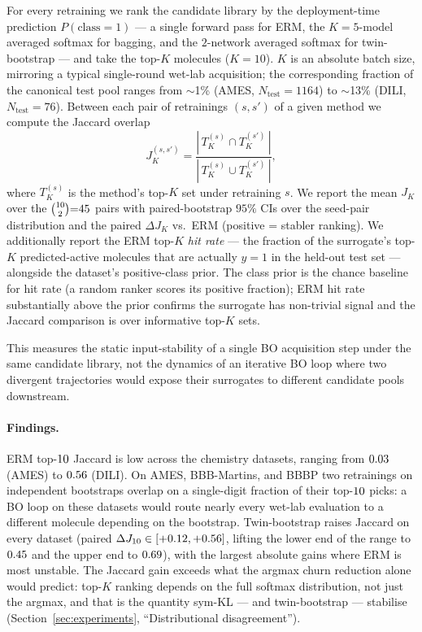 For every retraining we rank the candidate library by the
deployment-time prediction $P(\text{class}{=}1)$ --- a single
forward pass for ERM, the $K{=}5$-model averaged softmax for
bagging, and the $2$-network averaged softmax for twin-bootstrap
--- and take the top-$K$ molecules ($K{=}10$).  $K$ is an absolute
batch size, mirroring a typical single-round wet-lab acquisition;
the corresponding fraction of the canonical test pool ranges from
$\sim$1\% (AMES, $N_\text{test}{=}1164$) to $\sim$13\% (DILI,
$N_\text{test}{=}76$).  Between each pair of retrainings $(s, s')$
of a given method we compute the Jaccard overlap
\[
  J_K^{(s, s')} = \frac{|\,T_K^{(s)} \cap T_K^{(s')}\,|}
                       {|\,T_K^{(s)} \cup T_K^{(s')}\,|},
\]
where $T_K^{(s)}$ is the method's top-$K$ set under retraining $s$.
We report the mean $J_K$ over the $\binom{10}{2}{=}45$
pairs with paired-bootstrap $95\%$ CIs over the seed-pair
distribution and the paired $\Delta J_K$ vs.\ ERM (positive =
stabler ranking).  We additionally report the ERM top-$K$ \emph{hit
rate} --- the fraction of the surrogate's top-$K$ predicted-active
molecules that are actually $y{=}1$ in the held-out test set ---
alongside the dataset's positive-class prior.  The class prior is
the chance baseline for hit rate (a random ranker scores its
positive fraction); ERM hit rate substantially above the prior
confirms the surrogate has non-trivial signal and the Jaccard
comparison is over informative top-$K$ sets.

This measures the static input-stability of a single BO acquisition
step under the same candidate library, not the dynamics of an
iterative BO loop where two divergent trajectories would expose
their surrogates to different candidate pools downstream.



\paragraph{Findings.}
ERM top-$10$ Jaccard is low across the
\nDatasetsHeadline{} chemistry datasets, ranging from
$0.03$ (AMES) to $0.56$ (DILI).
On AMES, BBB-Martins, and BBBP two retrainings
on independent bootstraps overlap on a single-digit fraction of
their top-$10$ picks: a BO loop on these datasets would
route nearly every wet-lab evaluation to a different molecule
depending on the bootstrap.  Twin-bootstrap raises Jaccard on every
dataset (paired $\Delta J_{10} \in [+0.12,
+0.56]$, lifting the lower end of the range to
$0.45$ and the upper end to
$0.69$), with the largest absolute gains where
ERM is most unstable.  The Jaccard gain exceeds what the argmax
churn reduction alone would predict: top-$K$ ranking depends on
the full softmax distribution, not just the argmax, and that is the
quantity sym-KL --- and twin-bootstrap --- stabilise
(Section~\ref{sec:experiments}, ``Distributional disagreement'').

